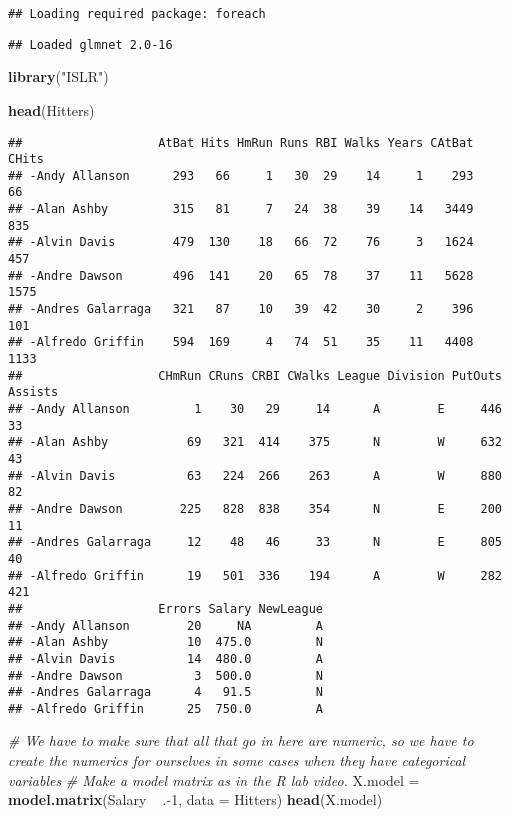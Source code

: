 \documentclass[]{article}
\newenvironment{Shaded}{\begin{snugshade}}{\end{snugshade}}
\newcommand{\KeywordTok}[1]{\textcolor[rgb]{0.13,0.29,0.53}{\textbf{{#1}}}}
\newcommand{\DataTypeTok}[1]{\textcolor[rgb]{0.13,0.29,0.53}{{#1}}}
\newcommand{\DecValTok}[1]{\textcolor[rgb]{0.00,0.00,0.81}{{#1}}}
\newcommand{\StringTok}[1]{\textcolor[rgb]{0.31,0.60,0.02}{{#1}}}
\newcommand{\CommentTok}[1]{\textcolor[rgb]{0.56,0.35,0.01}{\textit{{#1}}}}
\newcommand{\NormalTok}[1]{{#1}}
\begin{document}
\begin{verbatim}
## Loading required package: foreach
\end{verbatim}

\begin{verbatim}
## Loaded glmnet 2.0-16
\end{verbatim}

\begin{Shaded}
\begin{Highlighting}[]
\KeywordTok{library}\NormalTok{(}\StringTok{"ISLR"}\NormalTok{)}


\KeywordTok{head}\NormalTok{(Hitters)}
\end{Highlighting}
\end{Shaded}

\begin{verbatim}
##                   AtBat Hits HmRun Runs RBI Walks Years CAtBat CHits
## -Andy Allanson      293   66     1   30  29    14     1    293    66
## -Alan Ashby         315   81     7   24  38    39    14   3449   835
## -Alvin Davis        479  130    18   66  72    76     3   1624   457
## -Andre Dawson       496  141    20   65  78    37    11   5628  1575
## -Andres Galarraga   321   87    10   39  42    30     2    396   101
## -Alfredo Griffin    594  169     4   74  51    35    11   4408  1133
##                   CHmRun CRuns CRBI CWalks League Division PutOuts Assists
## -Andy Allanson         1    30   29     14      A        E     446      33
## -Alan Ashby           69   321  414    375      N        W     632      43
## -Alvin Davis          63   224  266    263      A        W     880      82
## -Andre Dawson        225   828  838    354      N        E     200      11
## -Andres Galarraga     12    48   46     33      N        E     805      40
## -Alfredo Griffin      19   501  336    194      A        W     282     421
##                   Errors Salary NewLeague
## -Andy Allanson        20     NA         A
## -Alan Ashby           10  475.0         N
## -Alvin Davis          14  480.0         A
## -Andre Dawson          3  500.0         N
## -Andres Galarraga      4   91.5         N
## -Alfredo Griffin      25  750.0         A
\end{verbatim}

\begin{Shaded}
\begin{Highlighting}[]
\CommentTok{# We have to make sure that all that go in here are numeric, so we have to create the numerics for ourselves in some cases when they have categorical variables }
\CommentTok{# Make a model matrix as in the R lab video.}
\NormalTok{X.model =}\StringTok{ }\KeywordTok{model.matrix}\NormalTok{(Salary ~}\StringTok{ }\NormalTok{.-}\DecValTok{1}\NormalTok{, }\DataTypeTok{data =} \NormalTok{Hitters)}
\KeywordTok{head}\NormalTok{(X.model)}
\end{Highlighting}
\end{Shaded}
\end{document}
